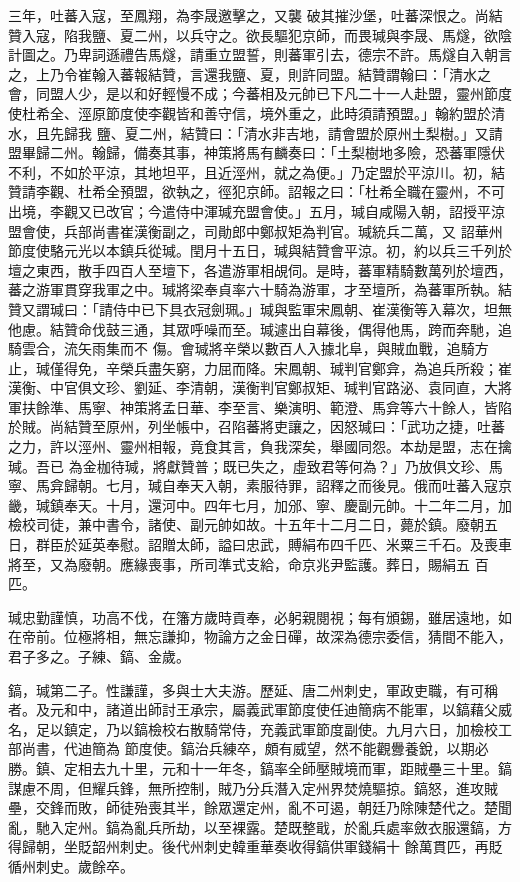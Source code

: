 \begin{pinyinscope}
 三年，吐蕃入寇，至鳳翔，為李晟邀擊之，又襲
 破其摧沙堡，吐蕃深恨之。尚結贊入寇，陷我鹽、夏二州，以兵守之。欲長驅犯京師，而畏瑊與李晟、馬燧，欲陰計圖之。乃卑詞遜禮告馬燧，請重立盟誓，則蕃軍引去，德宗不許。馬燧自入朝言之，上乃令崔翰入蕃報結贊，言還我鹽、夏，則許同盟。結贊謂翰曰：「清水之會，同盟人少，是以和好輕慢不成；今蕃相及元帥已下凡二十一人赴盟，靈州節度使杜希全、涇原節度使李觀皆和善守信，境外重之，此時須請預盟。」翰約盟於清水，且先歸我
 鹽、夏二州，結贊曰：「清水非吉地，請會盟於原州土梨樹。」又請盟畢歸二州。翰歸，備奏其事，神策將馬有麟奏曰：「土梨樹地多險，恐蕃軍隱伏不利，不如於平涼，其地坦平，且近涇州，就之為便。」乃定盟於平涼川。初，結贊請李觀、杜希全預盟，欲執之，徑犯京師。詔報之曰：「杜希全職在靈州，不可出境，李觀又已改官；今遣侍中渾瑊充盟會使。」五月，瑊自咸陽入朝，詔授平涼盟會使，兵部尚書崔漢衡副之，司勛郎中鄭叔矩為判官。瑊統兵二萬，又
 詔華州節度使駱元光以本鎮兵從瑊。閏月十五日，瑊與結贊會平涼。初，約以兵三千列於壇之東西，散手四百人至壇下，各遣游軍相覘伺。是時，蕃軍精騎數萬列於壇西，蕃之游軍貫穿我軍之中。瑊將梁奉貞率六十騎為游軍，才至壇所，為蕃軍所執。結贊又謂瑊曰：「請侍中已下具衣冠劍珮。」瑊與監軍宋鳳朝、崔漢衡等入幕次，坦無他慮。結贊命伐鼓三通，其眾呼噪而至。瑊遽出自幕後，偶得他馬，跨而奔馳，追騎雲合，流矢雨集而不
 傷。會瑊將辛榮以數百人入據北阜，與賊血戰，追騎方止，瑊僅得免，辛榮兵盡矢窮，力屈而降。宋鳳朝、瑊判官鄭弇，為追兵所殺；崔漢衡、中官俱文珍、劉延、李清朝，漢衡判官鄭叔矩、瑊判官路泌、袁同直，大將軍扶餘準、馬寧、神策將孟日華、李至言、樂演明、範澄、馬弇等六十餘人，皆陷於賊。尚結贊至原州，列坐帳中，召陷蕃將吏讓之，因怒瑊曰：「武功之捷，吐蕃之力，許以涇州、靈州相報，竟食其言，負我深矣，舉國同怨。本劫是盟，志在擒瑊。吾已
 為金枷待瑊，將獻贊普；既已失之，虛致君等何為？」乃放俱文珍、馬寧、馬弇歸朝。七月，瑊自奉天入朝，素服待罪，詔釋之而後見。俄而吐蕃入寇京畿，瑊鎮奉天。十月，還河中。四年七月，加邠、寧、慶副元帥。十二年二月，加檢校司徒，兼中書令，諸使、副元帥如故。十五年十二月二日，薨於鎮。廢朝五日，群臣於延英奉慰。詔贈太師，謚曰忠武，賻絹布四千匹、米粟三千石。及喪車將至，又為廢朝。應緣喪事，所司準式支給，命京兆尹監護。葬日，賜絹五
 百匹。



 瑊忠勤謹慎，功高不伐，在籓方歲時貢奉，必躬親閱視；每有頒錫，雖居遠地，如在帝前。位極將相，無忘謙抑，物論方之金日磾，故深為德宗委信，猜間不能入，君子多之。子練、鎬、金歲。



 鎬，瑊第二子。性謙謹，多與士大夫游。歷延、唐二州刺史，軍政吏職，有可稱者。及元和中，諸道出師討王承宗，屬義武軍節度使任迪簡病不能軍，以鎬藉父威名，足以鎮定，乃以鎬檢校右散騎常侍，充義武軍節度副使。九月六日，加檢校工部尚書，代迪簡為
 節度使。鎬治兵練卒，頗有威望，然不能觀釁養銳，以期必勝。鎮、定相去九十里，元和十一年冬，鎬率全師壓賊境而軍，距賊壘三十里。鎬謀慮不周，但耀兵鋒，無所控制，賊乃分兵潛入定州界焚燒驅掠。鎬怒，進攻賊壘，交鋒而敗，師徒殆喪其半，餘眾還定州，亂不可遏，朝廷乃除陳楚代之。楚聞亂，馳入定州。鎬為亂兵所劫，以至裸露。楚既整戢，於亂兵處率斂衣服還鎬，方得歸朝，坐貶韶州刺史。後代州刺史韓重華奏收得鎬供軍錢絹十
 餘萬貫匹，再貶循州刺史。歲餘卒。




\end{pinyinscope}
